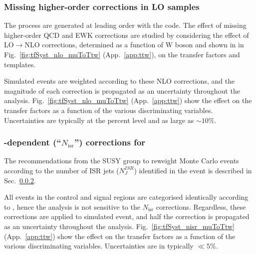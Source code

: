 \subsubsection{Missing higher-order corrections in LO \texorpdfstring{\MADGRAPH}{MadGraph}
  samples}
\label{sec:nlo}

The \wj process are generated at leading order with the \MADGRAPH
code. The effect of missing higher-order QCD and EWK corrections are
studied by considering the effect of LO$\rightarrow$NLO corrections,
determined as a function of W boson \Pt and shown in in
Fig.~\ref{fig:tfSyst_nlo_muToTtw} (App.~\ref{app:ttw}), on the
transfer factors and \HTmiss templates. 

Simulated \wj events are weighted according to these NLO corrections,
and the magnitude of each correction is propagated as an uncertainty
throughout the analysis. Fig.~\ref{fig:tfSyst_nlo_muToTtw}
(App.~\ref{app:ttw}) show the effect on the transfer factors as a
function of the various discriminating variables. Uncertainties are
typically at the percent level and as large as $\sim 10\%$.


\subsubsection{\texorpdfstring{\njet}{Njet}-dependent (``\texorpdfstring{$N_\textrm{isr}$}{Nisr}'') corrections for \ttbar}
\label{sec:nisr}

The recommendations from the SUSY group to reweight \MADGRAPH \ttbar
Monte Carlo events according to the number of ISR jets ($N_J^{ISR}$)
identified in the event is described in
Sec.~\ref{sec:nisr}. 

All events in the control and signal regions are categorised
identically according to \njet, hence the analysis is not sensitive to
the $N_\textrm{isr}$ corrections. Regardless, these corrections are
applied to simulated \ttbar event, and half the correction is
propagated as an uncertainty throughout the
analysis. Fig.~\ref{fig:tfSyst_nisr_muToTtw} (App.~\ref{app:ttw}) show
the effect on the transfer factors as a function of the various
discriminating variables. Uncertainties are in typically $\ll 5\%$.

